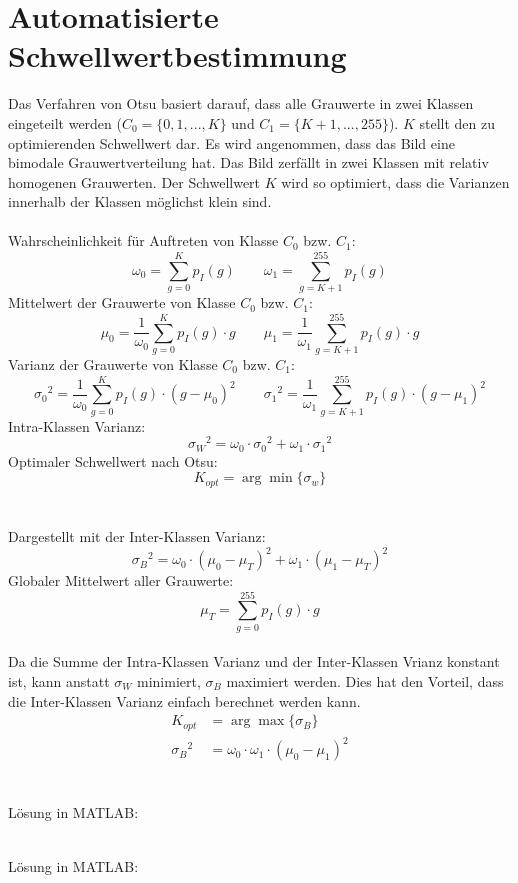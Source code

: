 \section{Automatisierte Schwellwertbestimmung}
Das Verfahren von Otsu basiert darauf, dass alle Grauwerte in zwei Klassen eingeteilt werden ($C_0 = \{0,1,...,K\}$ und $C_1=\{K+1,...,255\}$). 
$K$ stellt den zu optimierenden Schwellwert dar.
Es wird angenommen, dass das Bild eine bimodale Grauwertverteilung hat.
Das Bild zerfällt in zwei Klassen mit relativ homogenen Grauwerten.
Der Schwellwert $K$ wird so optimiert, dass die Varianzen innerhalb der Klassen möglichst klein sind.\\
\\
Wahrscheinlichkeit für Auftreten von Klasse $C_0$ bzw. $C_1$:
\[
	\omega_0 = \sum_{g=0}^{K}p_I(g) \qquad 
	\omega_1 = \sum_{g=K+1}^{255}p_I(g)
\]
Mittelwert der Grauwerte von Klasse $C_0$ bzw. $C_1$:
\[
	\mu_0 = \frac{1}{\omega_0} \sum_{g=0}^{K} p_I(g) \cdot g \qquad
	\mu_1 = \frac{1}{\omega_1} \sum_{g=K+1}^{255} p_I(g) \cdot g
\]
Varianz der Grauwerte von Klasse $C_0$ bzw. $C_1$:
\[
	{\sigma_0}^2 = \frac{1}{\omega_0} \sum_{g=0}^{K} p_I(g) \cdot (g - \mu_0)^2 \qquad
	{\sigma_1}^2 = \frac{1}{\omega_1} \sum_{g=K+1}^{255} p_I(g) \cdot (g - \mu_1)^2
\]
Intra-Klassen Varianz:
\[
	{\sigma_W}^2 = \omega_0 \cdot {\sigma_0}^2 + \omega_1 \cdot {\sigma_1}^2
\]
Optimaler Schwellwert nach Otsu:
\[
	K_{opt} = \arg \min \{\sigma_w\}
\]
~\\\\
Dargestellt mit der Inter-Klassen Varianz:
\[
	{\sigma_B}^2 = \omega_0 \cdot (\mu_0 - \mu_T)^2 + \omega_1 \cdot (\mu_1 - \mu_T)^2
\]
Globaler Mittelwert aller Grauwerte:
\[
	\mu_T = \sum_{g=0}^{255}p_I(g) \cdot g
\]
~\\
Da die Summe der Intra-Klassen Varianz und der Inter-Klassen Vrianz konstant ist, kann anstatt $\sigma_W$ minimiert, $\sigma_B$ maximiert werden.
Dies hat den Vorteil, dass die Inter-Klassen Varianz einfach berechnet werden kann.
\[\begin{aligned}
	K_{opt} &= \arg\max\{\sigma_B\}\\
	{\sigma_B}^2 &= \omega_0 \cdot \omega_1 \cdot (\mu_0 - \mu_1)^2
\end{aligned}\]
~\\\\
Lösung in MATLAB:
\lstset{language=Matlab}

~\\
Lösung in MATLAB:
\lstset{language=Matlab}

~\\

